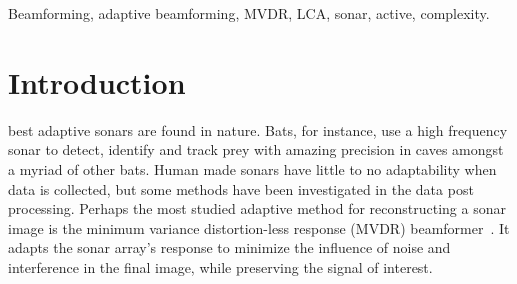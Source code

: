 \documentclass[10pt,journal,draftclsnofoot,onecolumn]{IEEEtran}
\newcommand\1{\vec 1}
\begin{document}
{\begin{abstract}
% 


\end{abstract}

\ifPeerReview\else
\begin{IEEEkeywords}\color{gray}
Beamforming, adaptive beamforming, MVDR, LCA, sonar, active, complexity.
\end{IEEEkeywords}
\fi}

\maketitle

\IEEEdisplaynotcompsoctitleabstractindextext


\IEEEpeerreviewmaketitle

\section{Introduction}


 best adaptive sonars are found in nature. Bats, for instance, use a high frequency sonar to detect, identify and track prey with amazing precision in caves amongst a myriad of other bats. Human made sonars have little to no adaptability when data is collected, but some methods have been investigated in the data post processing. Perhaps the most studied adaptive method for reconstructing a sonar image is the minimum variance distortion-less response (MVDR) beamformer~\cite{Capon1969}. It adapts the sonar array's response to minimize the influence of noise and interference in the final image, while preserving the signal of interest.
\end{document}
